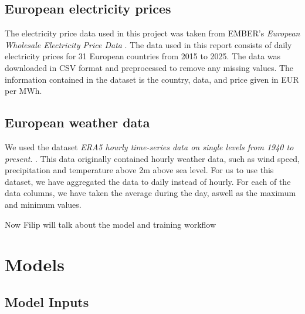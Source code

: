 \documentclass[12pt]{article}
\begin{document}
\subsection{European electricity prices}

The electricity price data used in this project was taken from EMBER's \textit{European Wholesale Electricity Price Data} \citep{ember2025}.  The data used in this report consists of daily electricity prices for 31 European countries from 2015 to 2025. The data was downloaded in CSV format and preprocessed to remove any missing values. The information contained in the dataset is the country, data, and price given in EUR per MWh. 

\subsection{European weather data}
We used the dataset \textit{ERA5 hourly time-series data on single levels from 1940 to present}. \citep{hersbach2025era5}. This data originally contained hourly weather data, such as wind speed, precipitation and temperature above 2m above sea level. For us to use this dataset, we have aggregated the data to daily instead of hourly. For each of the data columns, we have taken the average during the day, aswell as the maximum and minimum values. 

Now Filip will talk about the model and training workflow


 \clearpage




\section{Models}

\subsection*{Model Inputs}
\end{document}

